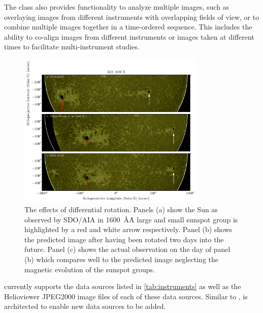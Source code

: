 The \Map class also provides functionality to analyze multiple images, such as overlaying images from different instruments with overlapping fields of view, or to combine multiple images together in a time-ordered sequence.
This includes the ability to co-align images from different instruments or images taken at different times to facilitate multi-instrument studies.


\begin{figure}
    \center
    \includegraphics[width = 0.8\textwidth]{figures/fig_diff_rot_1600.pdf}
    \caption{The effects of differential rotation.
    Panels (a) show the Sun as observed by SDO/AIA in 1600~\AA\.
    A large and small sunspot group is highlighted by a red and white arrow respectively.
    Panel (b) shows the predicted image after having been rotated two days into the future.
    Panel (c) shows the actual observation on the day of panel (b) which compares well to the predicted image neglecting the magnetic evolution of the sunspot groups.}
    \label{fig:diff_rot}
\end{figure}

\Map currently supports the data sources listed in \autoref{tab:instruments} as well as the Helioviewer JPEG2000 image files of  each of these data sources. Similar to \Timeseries, \Map is architected to enable new data sources to be added.
